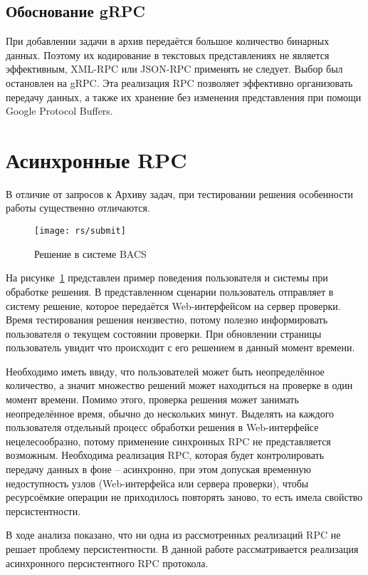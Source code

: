 \subsection{Обоснование gRPC}
При добавлении задачи в архив передаётся большое количество бинарных данных.
Поэтому их кодирование в текстовых представлениях не является эффективным,
XML-RPC или JSON-RPC применять не следует. Выбор был остановлен на gRPC.
Эта реализация RPC позволяет эффективно организовать передачу данных,
а также их хранение без изменения представления при помощи Google Protocol
Buffers.

\section{Асинхронные RPC}
В отличие от запросов к Архиву задач, при тестировании решения особенности
работы существенно отличаются.

\begin{figure}[H]
    \centering
    \texttt{[image: rs/submit]}
    \caption{Решение в системе BACS}
    \label{fig:submit}
\end{figure}

На рисунке~\ref{fig:submit} представлен пример поведения пользователя
и системы при обработке решения. В представленном сценарии пользователь
отправляет в систему решение, которое передаётся Web-интерфейсом
на сервер проверки. Время тестирования решения неизвестно, потому
полезно информировать пользователя о текущем состоянии проверки.
При обновлении страницы пользователь увидит что происходит с его
решением в данный момент времени.

Необходимо иметь ввиду, что пользователей может быть неопределённое количество,
а значит множество решений может находиться на проверке в один момент времени.
Помимо этого, проверка решения может занимать неопределённое время,
обычно до нескольких минут. Выделять на каждого пользователя отдельный
процесс обработки решения в Web-интерфейсе нецелесообразно,
потому применение синхронных RPC не представляется возможным.
Необходима реализация RPC, которая будет контролировать передачу данных
в фоне -- асинхронно, при этом допуская временную недоступность узлов
(Web-интерфейса или сервера проверки), чтобы ресурсоёмкие операции
не приходилось повторять заново, то есть имела свойство персистентности.

В ходе анализа показано, что ни одна из рассмотренных реализаций RPC
не решает проблему персистентности. В данной работе рассматривается
реализация асинхронного персистентного RPC протокола.

